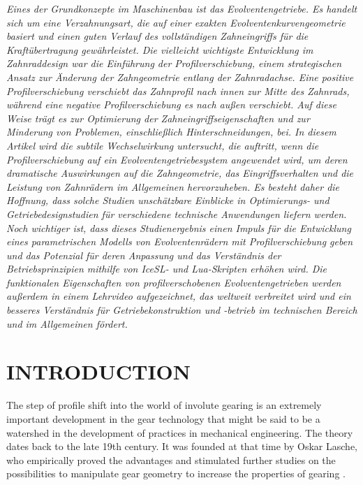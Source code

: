 \documentclass{article}
\begin{document}
    \emph{
    Eines der Grundkonzepte im Maschinenbau ist das Evolventengetriebe. Es handelt sich um eine Verzahnungsart, die auf einer exakten Evolventenkurvengeometrie basiert und einen guten Verlauf des vollständigen Zahneingriffs für die Kraftübertragung gewährleistet. Die vielleicht wichtigste Entwicklung im Zahnraddesign war die Einführung der Profilverschiebung, einem strategischen Ansatz zur Änderung der Zahngeometrie entlang der Zahnradachse. Eine positive Profilverschiebung verschiebt das Zahnprofil nach innen zur Mitte des Zahnrads, während eine negative Profilverschiebung es nach außen verschiebt. Auf diese Weise trägt es zur Optimierung der Zahneingriffseigenschaften und zur Minderung von Problemen, einschließlich Hinterschneidungen, bei. In diesem Artikel wird die subtile Wechselwirkung untersucht, die auftritt, wenn die Profilverschiebung auf ein Evolventengetriebesystem angewendet wird, um deren dramatische Auswirkungen auf die Zahngeometrie, das Eingriffsverhalten und die Leistung von Zahnrädern im Allgemeinen hervorzuheben. Es besteht daher die Hoffnung, dass solche Studien unschätzbare Einblicke in Optimierungs- und Getriebedesignstudien für verschiedene technische Anwendungen liefern werden. Noch wichtiger ist, dass dieses Studienergebnis einen Impuls für die Entwicklung eines parametrischen Modells von Evolventenrädern mit Profilverschiebung geben und das Potenzial für deren Anpassung und das Verständnis der Betriebsprinzipien mithilfe von IceSL- und Lua-Skripten erhöhen wird. Die funktionalen Eigenschaften von profilverschobenen Evolventengetrieben werden außerdem in einem Lehrvideo aufgezeichnet, das weltweit verbreitet wird und ein besseres Verständnis für Getriebekonstruktion und -betrieb im technischen Bereich und im Allgemeinen fördert.\\}
\newpage
\tableofcontents                 %
\newpage
\section{INTRODUCTION}

\justifying
The step of profile shift into the world of involute gearing is an extremely important development in the gear technology that might be said to be a watershed in the development of practices in mechanical engineering. The theory dates back to the late 19th century. It was founded at that time by Oskar Lasche, who empirically proved the advantages and stimulated further studies on the possibilities to manipulate gear geometry to increase the properties of gearing \cite{MilleniumOutlook14}. 
\end{document}
